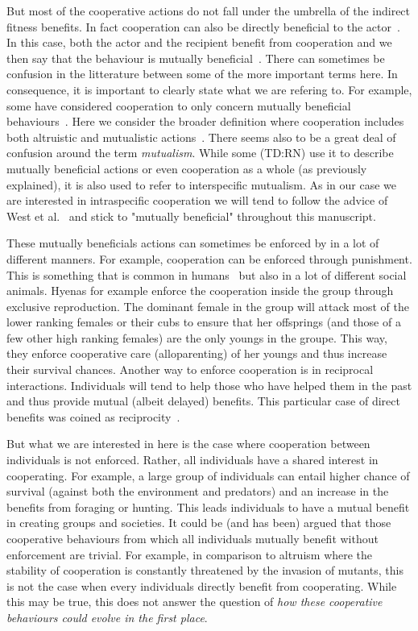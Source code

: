     But most of the cooperative actions do not fall under the umbrella of the indirect fitness benefits. In fact cooperation can also be directly beneficial to the actor~\parencite{Leimar2010}. In this case, both the actor and the recipient benefit from cooperation and we then say that the behaviour is mutually beneficial~\parencite{West2007a}. There can sometimes be confusion in the litterature between some of the more important terms here. In consequence, it is important to clearly state what we are refering to. For example, some have considered cooperation to only concern mutually beneficial behaviours~\parencite{Trivers1985, Lehmann2006}. Here we consider the broader definition where cooperation includes both altruistic and mutualistic actions~\parencite{West2007a}. There seems also to be a great deal of confusion around the term \emph{mutualism}. While some (TD:RN) use it to describe mutually beneficial actions or even cooperation as a whole (as previously explained), it is also used to refer to interspecific mutualism. As in our case we are interested in intraspecific cooperation we will tend to follow the advice of West et al.~\parencite{West2007} and stick to "mutually beneficial" throughout this manuscript.

    These mutually beneficials actions can sometimes be enforced by in a lot of different manners. For example, cooperation can be enforced through punishment. This is something that is common in humans~\parencite{Fehr2002} but also in a lot of different social animals. Hyenas for example enforce the cooperation inside the group through exclusive reproduction. The dominant female in the group will attack most of the lower ranking females or their cubs to ensure that her offsprings (and those of a few other high ranking females) are the only youngs in the groupe. This way, they enforce cooperative care (alloparenting) of her youngs and thus increase their survival chances. Another way to enforce cooperation is in reciprocal interactions. Individuals will tend to help those who have helped them in the past and thus provide mutual (albeit delayed) benefits. This particular case of direct benefits was coined as reciprocity~\parencite{Trivers1971, Lehmann2006}.


    But what we are interested in here is the case where cooperation between individuals is not enforced. Rather, all individuals have a shared interest in cooperating. For example, a large group of individuals can entail higher chance of survival (against both the environment and predators) and an increase in the benefits from foraging or hunting. This leads individuals to have a mutual benefit in creating groups and societies. It could be (and has been) argued that those cooperative behaviours from which all individuals mutually benefit without enforcement are trivial. For example, in comparison to altruism where the stability of cooperation is constantly threatened by the invasion of mutants, this is not the case when every individuals directly benefit from cooperating. While this may be true, this does not answer the question of \emph{how these cooperative behaviours could evolve in the first place}.

